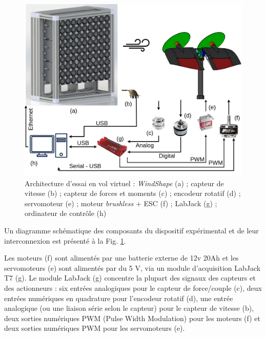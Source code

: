 \begin{figure}[!ht]
    \includegraphics[width=\columnwidth]{figures/maquette-min.png}
    \caption{Architecture d'essai en vol virtuel : \textit{WindShape} (a) ; capteur de vitesse (b) ; capteur de forces et moments (c) ; encodeur rotatif (d) ; servomoteur (e) ; moteur \textit{brushless} + ESC (f) ; LabJack (g) ; ordinateur de contrôle (h)}
    \label{fig:archi}
\end{figure}
Un diagramme schématique des composants du dispositif expérimental et de leur interconnexion est présenté à la Fig. \ref{fig:archi}.

Les moteurs (f) sont alimentés par une batterie externe de 12v 20Ah et les servomoteurs (e) sont alimentés par du 5 V, via un module d'acquisition LabJack T7 \cite[]{LabJack} (g). Le module LabJack (g) concentre la plupart des signaux des capteurs et des actionneurs : six entrées analogiques pour le capteur de force/couple (c), deux entrées numériques en quadrature pour l'encodeur rotatif (d), une entrée analogique (ou une liaison série selon le capteur) pour le capteur de vitesse (b), deux sorties numériques PWM (Pulse Width Modulation)  pour les moteurs (f) et deux sorties numériques PWM pour les servomoteurs (e). 


